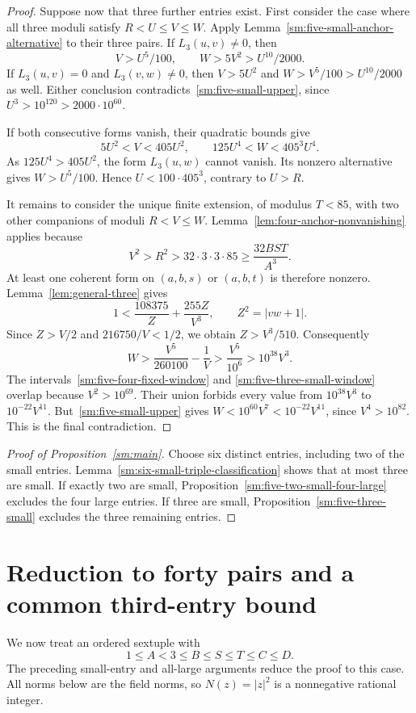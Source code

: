 \documentclass[12pt]{article}
\numberwithin{equation}{section}
\begin{document}
\begin{proof}
Suppose now that three further entries exist. First consider the
case where all three moduli satisfy $R<U\le V\le W$.
Apply Lemma~\ref{sm:five-small-anchor-alternative} to their three pairs.
If $L_3(u,v)\ne0$, then
\[
 V>U^5/100,\qquad W>5V^2>U^{10}/2000.
\]
If $L_3(u,v)=0$ and $L_3(v,w)\ne0$, then
$V>5U^2$ and $W>V^5/100>U^{10}/2000$ as well.
Either conclusion contradicts~\eqref{sm:five-small-upper}, since
$U^3>10^{120}>2000\cdot10^{60}$.

If both consecutive forms vanish, their quadratic bounds give
\[
 5U^2<V<405U^2,\qquad
 125U^4<W<405^3U^4.
\]
As $125U^4>405U^2$, the form $L_3(u,w)$ cannot vanish.
Its nonzero alternative gives $W>U^5/100$. Hence
$U<100\cdot405^3$, contrary to $U>R$.

It remains to consider the unique finite extension, of modulus
$T<85$, with two other companions of moduli $R<V\le W$.
Lemma~\ref{lem:four-anchor-nonvanishing} applies because
\[
 V^2>R^2>32\cdot3\cdot3\cdot85\ge\frac{32BST}{A^3}.
\]
At least one coherent form on $(a,b,s)$ or $(a,b,t)$ is therefore
nonzero. Lemma~\ref{lem:general-three} gives
\[
 1<\frac{108375}{Z}+\frac{255Z}{V^3},\qquad Z^2=|vw+1|.
\]
Since $Z>V/2$ and $216750/V<1/2$, we obtain $Z>V^3/510$.
Consequently
\[
 W>\frac{V^5}{260100}-\frac1V
   >\frac{V^5}{10^6}>10^{38}V^3.
\]
The intervals~\eqref{sm:five-four-fixed-window} and
\eqref{sm:five-three-small-window} overlap because $V^2>10^{69}$.
Their union forbids every value from $10^{38}V^3$ to
$10^{-22}V^{11}$. But~\eqref{sm:five-small-upper} gives
$W<10^{60}V^7<10^{-22}V^{11}$, since $V^4>10^{82}$.
This is the final contradiction.
\end{proof}


\begin{proof}[Proof of Proposition~\ref{sm:main}]
Choose six distinct entries, including two of the small entries.
Lemma~\ref{sm:six-small-triple-classification} shows that at most three
are small. If exactly two are small, Proposition~\ref{sm:five-two-small-four-large}
excludes the four large entries. If three are small,
Proposition~\ref{sm:five-three-small} excludes the three remaining entries.
\end{proof}

\section{Reduction to forty pairs and a common third-entry bound}
\label{sec:pair-reduction}

We now treat an ordered sextuple with
\[
 1\le A<3\le B\le S\le T\le C\le D.
\]
The preceding small-entry and all-large arguments reduce the proof to this
case. All norms below are the field norms, so \(N(z)=|z|^2\) is a
nonnegative rational integer.
\end{document}
